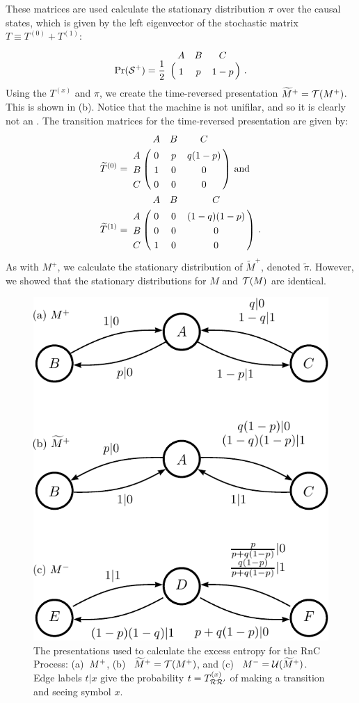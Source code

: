 These matrices are used calculate the stationary distribution $\pi$ over the 
causal states, which is given by the left eigenvector of the stochastic
matrix $T \equiv T^{(0)} + T^{(1)}$:
\begin{align*}
\Pr(\FutureCausalState) = \frac{1}{2} \bordermatrix{
  & A & B & C\cr
  & 1 & p & 1-p
} ~.
\end{align*}
Using the $T^{(x)}$ and $\pi$, we create the time-reversed presentation
$\widetilde{M}^+ = \mathcal{T}({M}^{+})$. This is shown in (b).
Notice that the machine is not unifilar, and so it is clearly not an \eM.
The transition matrices for the time-reversed presentation are given by:
\begin{align*}
\widetilde{T}^{(0)} &=
\bordermatrix{ 
  & A & B & C\cr
A & 0 & p & q(1-p)\cr
B & 1 & 0 & 0\cr
C & 0 & 0 & 0
} \mathrm{~and}\\
\widetilde{T}^{(1)} &=
\bordermatrix{ 
  & A & B & C\cr
A & 0 & 0 & (1-q)(1-p)\cr
B & 0 & 0 & 0\cr
C & 1 & 0 & 0
}~.
\end{align*}
As with $M^+$, we calculate the stationary distribution of $\widetilde{M}^+$,
denoted $\widetilde{\pi}$. However, we showed that the stationary
distributions for $M$ and $\mathcal{T}(M)$ are identical.

\begin{figure}[th]
\centering
\includegraphics[scale=\figscale]{RnC}
\caption{
  The presentations used to calculate the excess entropy for the RnC
  Process: (a)~${M}^{+}$, (b)~%
           \mbox{$\widetilde{M}^+ = \mathcal{T}({M}^{+})$}, and (c)~%
           \mbox{${M}^{-} = \mathcal{U}(\widetilde{M}^+)$}.
  Edge labels $t|x$ give the probability
  \mbox{$t = T_{\mathcal{R} \mathcal{R}^\prime}^{(x)}$} of making a 
  transition and seeing symbol $x$.
  }
\label{fig:RnC}
\end{figure}

